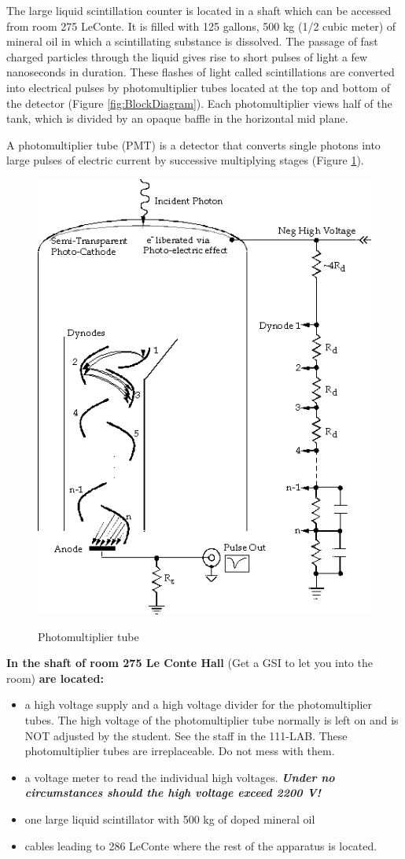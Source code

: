 \documentclass{../lab}
\begin{document}
The large liquid scintillation counter is located in a shaft which can be accessed from room 275 LeConte. It is filled with 125 gallons, 500 kg (1/2 cubic meter) of mineral oil in which a scintillating substance is dissolved. The passage of fast charged particles through the liquid gives rise to short pulses of light a few nanoseconds in duration. These flashes of light called scintillations are converted into electrical pulses by photomultiplier tubes located at the top and bottom of the detector (Figure \ref{fig:BlockDiagram}). Each photomultiplier views half of the tank, which is divided by an opaque baffle in the horizontal mid plane.

A photomultiplier tube (PMT) is a detector that converts single photons into large pulses of electric current by successive multiplying stages (Figure \ref{fig:PhotomultiplierTube}).

\begin{figure}[h]
    \centering
    \href{http://experimentationlab.berkeley.edu/sites/default/files/images/MUOimage056.gif}{\includegraphics[width=0.5\linewidth]{images/MUOimage056.png}}
    \caption{Photomultiplier tube}
    \label{fig:PhotomultiplierTube}
\end{figure}

\noindent\textbf{In the shaft of room 275 Le Conte Hall} (Get a GSI to let you into the room) \textbf{are located:}

\begin{itemize}
    \item a high voltage supply and a high voltage divider for the photomultiplier tubes. The high voltage of the photomultiplier tube normally is left on and is NOT adjusted by the student. See the staff in the 111-LAB. These photomultiplier tubes are irreplaceable. Do not mess with them.

    \item a voltage meter to read the individual high voltages. \emph{\textbf{Under no circumstances should the high voltage exceed 2200 V!}}

    \item one large liquid scintillator with 500 kg of doped mineral oil

    \item cables leading to 286 LeConte where the rest of the apparatus is located.
\end{itemize}
\end{document}
